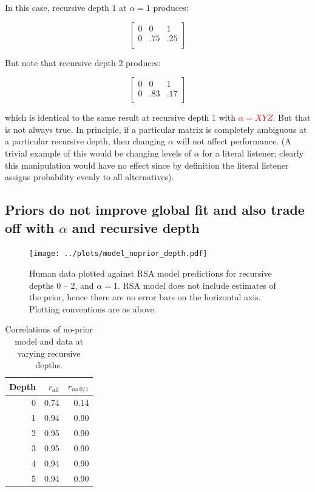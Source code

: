\documentclass[man,noapacite]{apa2}
\newcommand{\red}[1]{\textcolor{red}{#1}}
\begin{document}
\noindent In this case, recursive depth 1 at $\alpha=1$ produces:

\begin{equation}
\left[
    \begin{array}{ccc}
      0 & 0 & 1 \\
      0 & .75 & .25\\
    \end{array}
  \right]
\end{equation}

\noindent But note that recursive depth 2 produces:

\begin{equation}
\left[
    \begin{array}{ccc}
      0 & 0 & 1 \\
      0 & .83 & .17\\
    \end{array}
  \right]
\end{equation}

\noindent which is identical to the same result at recursive depth 1 with \red{$\alpha = XYZ$}. But that is not always true. In principle, if a particular matrix is completely ambiguous at a particular recursive depth, then changing $\alpha$ will not affect performance. (A trivial example of this would be changing levels of $\alpha$ for a literal listener; clearly this manipulation would have no effect since by definition the literal listener assigns probability evenly to all alternatives).

\subsection{Priors do not improve global fit and also trade off with $\alpha$ and recursive depth}

\begin{figure}[t]
 \centering
 \texttt{[image: ../plots/model\_noprior\_depth.pdf]}
 \caption{\label{fig:noprior} Human data plotted against RSA model predictions for recursive depths 0 -- 2, and $\alpha=1$. RSA model does not include estimates of the prior, hence there are no error bars on the horizontal axis. Plotting conventions are as above.}
\end{figure}

\begin{table}[ht]
\centering
\begin{tabular}{rrr}
  \hline
  Depth & $r_{all}$ & $r_{no~0/1}$ \\
  \hline
  0 & 0.74 & 0.14 \\
    1 & 0.94 & 0.90 \\
    2 & 0.95 & 0.90 \\
    3 & 0.95 & 0.90 \\
    4 & 0.94 & 0.90 \\
    5 & 0.94 & 0.90 \\
   \hline
\end{tabular}
\caption{\label{tab:corrs-noprior} Correlations of no-prior model and data at varying recursive depths.}
\end{table}
\end{document}
